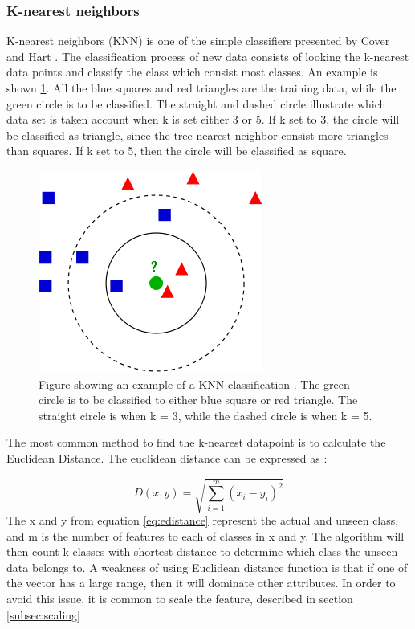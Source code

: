 \documentclass[USenglish]{ifimaster}  %
\begin{document}
\subsubsection{K-nearest neighbors }
K-nearest neighbors (KNN) is one of the simple classifiers presented by Cover and Hart \cite{1053964}. The classification process of new data consists of looking the k-nearest data points and classify the class which consist most classes. An example is shown \ref{fig:KNN}. All the blue squares and red triangles are the training data, while the green circle is to be classified. The straight and dashed circle illustrate which data set is taken account when k is set either 3 or 5. If k set to  3, the circle will be classified as triangle, since the tree nearest neighbor consist more triangles than squares. If k set to 5, then the circle will be classified as square.
	
\begin{figure}[h]
		\centering
		\includegraphics[scale=0.5]{Figures/KNN.png}
		\caption{Figure showing an example of a KNN classification \cite{KnnClassification}. The green circle is to be classified to either blue square or red triangle. The straight circle is when k = 3, while the dashed circle is when k = 5.}
		\label{fig:KNN}
\end{figure}
	
The most common method to find the k-nearest datapoint is to calculate the Euclidean Distance. The euclidean distance can be expressed as \cite{Bao2004}:
	
	
\begin{equation}
	D(x,y)=\sqrt{\sum_{i=1}^{m}(x_{i}-y_{i})^2}
	\label{eq:edistance}
\end{equation}
The x and y from equation \ref{eq:edistance} represent the actual and unseen class, and m is the number of features to each of classes in x and y. The algorithm will then count k classes with shortest distance to determine which class the unseen data belongs to. A weakness of using Euclidean distance function is that if one of the vector has a large range, then it will dominate other attributes. In order to avoid this issue, it is common to scale the feature, described in section \ref{subsec:scaling}
	
\end{document}
